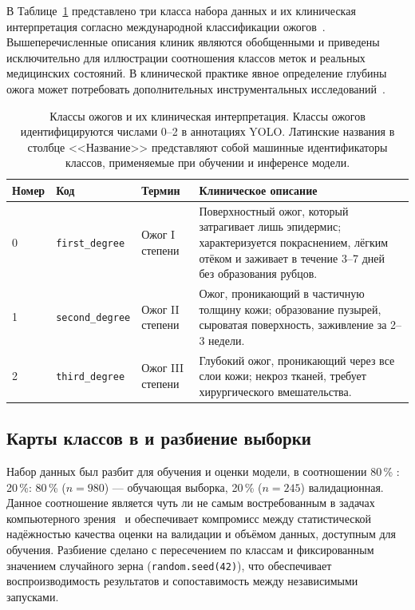 В Таблице~\ref{tab:classes} представлено три класса набора данных и их клиническая интерпретация согласно международной классификации ожогов~\cite{peck2012burns,monstrey2008assessment}. Вышеперечисленные описания клиник являются обобщенными и приведены исключительно для иллюстрации соотношения классов меток и реальных медицинских состояний. В клинической практике явное определение глубины ожога может потребовать дополнительных инструментальных исследований~\cite{hoeksema2009accuracy}.

\begin{table}[H]
\centering
\caption{Классы ожогов и их клиническая интерпретация. Классы ожогов идентифицируются числами 0--2 в аннотациях YOLO. Латинские названия в столбце <<Название>> представляют собой машинные идентификаторы классов, применяемые при обучении и инференсе модели.}
\label{tab:classes}
\begin{tabular}{p{1.2cm} p{3.0cm} p{3.0cm} p{6.5cm}}
\toprule
\textbf{Номер} & \textbf{Код} & \textbf{Термин} & \textbf{Клиническое описание} \\
\midrule
0 & \texttt{first\_degree}  & Ожог I степени   & Поверхностный ожог, который затрагивает лишь эпидермис; характеризуется покраснением, лёгким отёком и заживает в течение 3--7 дней без образования рубцов. \\
1 & \texttt{second\_degree} & Ожог II степени  & Ожог, проникающий в частичную толщину кожи; образование пузырей, сыроватая поверхность, заживление за 2--3 недели. \\
2 & \texttt{third\_degree}  & Ожог III степени & Глубокий ожог, проникающий через все слои кожи; некроз тканей, требует хирургического вмешательства. \\
\bottomrule
\end{tabular}
\end{table}

\subsection{Карты классов в и разбиение выборки}
\label{sec:split}

Набор данных был разбит для обучения и оценки модели, в соотношении 80\,\% : 20\,\%: 80\,\% ($n{=}980$) --- обучающая выборка, 20\,\% ($n{=}245$) валидационная. Данное соотношение является чуть ли не самым востребованным в задачах компьютерного зрения~\cite{he2016resnet,everingham2010pascal} и обеспечивает компромисс между статистической надёжностью качества оценки на валидации и объёмом данных, доступным для обучения. Разбиение сделано с пересечением по классам и фиксированным значением случайного зерна (\texttt{random.seed(42)}), что обеспечивает воспроизводимость результатов и сопоставимость между независимыми запусками.

